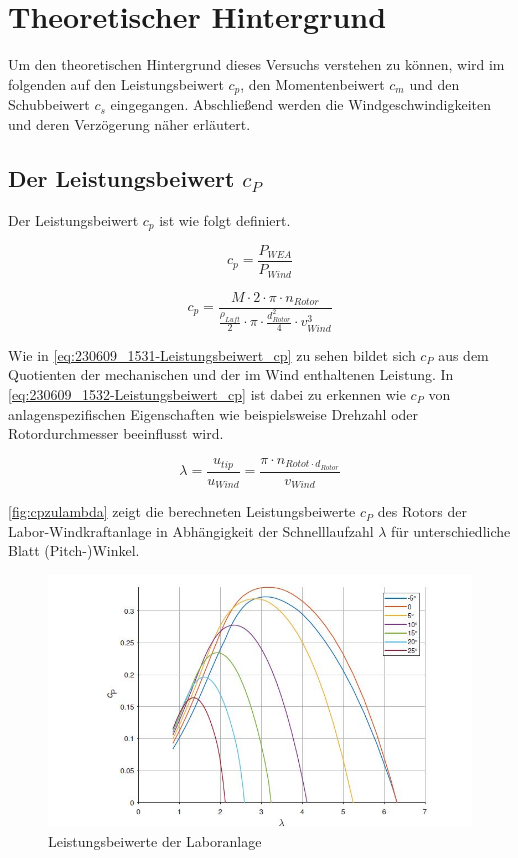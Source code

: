 \section{Theoretischer Hintergrund}
Um den theoretischen Hintergrund dieses Versuchs verstehen zu können, wird im folgenden auf den Leistungsbeiwert $c_{p}$, den Momentenbeiwert $c_{m}$ und den Schubbeiwert $c_{s}$ eingegangen. Abschließend werden die Windgeschwindigkeiten und deren Verzögerung näher erläutert.
\subsection{Der Leistungsbeiwert \texorpdfstring{$c_P$}{}}

Der Leistungsbeiwert $c_{p}$ ist wie folgt definiert.

\begin{equation}
  c_{p}= \frac{P_{WEA}}{P_{Wind}}
    \label{eq:230609_1531-Leistungsbeiwert_cp}
\end{equation}

\begin{equation}
  c_{p}= \frac{M \cdot 2 \cdot \pi \cdot n_{Rotor}}{\frac{\rho_{Luft}}{2}\cdot \pi \cdot \frac{d^2_{Rotor}}{4} \cdot v^3_{Wind} }
    \label{eq:230609_1532-Leistungsbeiwert_cp}
\end{equation}

Wie in \autoref{eq:230609_1531-Leistungsbeiwert_cp} zu sehen bildet sich $c_P$ aus dem Quotienten der mechanischen und der im Wind enthaltenen Leistung. 
In \autoref{eq:230609_1532-Leistungsbeiwert_cp} ist dabei zu erkennen wie $c_P$ von anlagenspezifischen Eigenschaften wie beispielsweise Drehzahl oder Rotordurchmesser beeinflusst wird.

\begin{equation}
\lambda=\frac{u_{tip}}{u_{Wind}}=\frac{\pi \cdot n_{Rotot \cdot d_{Rotor}}}{v_{Wind}}
    \label{eq:Schnelllaufzahl}
\end{equation}

\autoref{fig:cpzulambda} zeigt die berechneten Leistungsbeiwerte $c_P$ des Rotors der Labor-Windkraftanlage in Abhängigkeit der Schnelllaufzahl $\lambda$ für unterschiedliche Blatt (Pitch-)Winkel.
\begin{figure}[H]
    \centering
    \includegraphics[width=1\textwidth]{Abbildungen/cpzulambda.jpg}
    \caption{Leistungsbeiwerte der Laboranlage\cite{Anleitung}}
    \label{fig:cpzulambda}
\end{figure}

